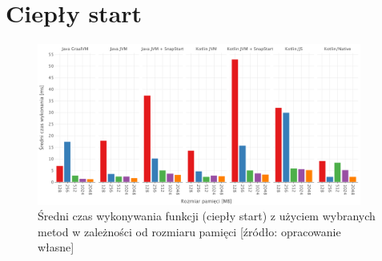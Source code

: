 \section{Ciepły start}\label{chapter:results_warm_start}

\begin{figure}[h]
    \centering
    \includegraphics[width=0.95\textwidth]{charts/results/avg-warm-start.png}
    \caption{Średni czas wykonywania funkcji (ciepły start) z użyciem wybranych metod w zależności od rozmiaru pamięci [źródło: opracowanie własne]}
    \label{fig:avg_warm_start}
\end{figure}

